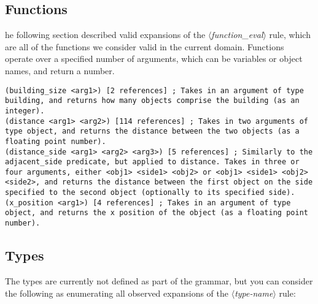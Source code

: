 \documentclass{article}
\newcommand{\dsl}[1]{{\it $\langle$#1$\rangle$}}
\begin{document}
\subsection{Functions} \label{sec:functions}
he following section described valid expansions of the \dsl{function_eval} rule,
        which are all of the functions we consider valid in the current domain.
        Functions operate over a specified number of arguments, which can be variables or object names, and return a number.
\begin{lstlisting}
(building_size <arg1>) [2 references] ; Takes in an argument of type building, and returns how many objects comprise the building (as an integer).
(distance <arg1> <arg2>) [114 references] ; Takes in two arguments of type object, and returns the distance between the two objects (as a floating point number).
(distance_side <arg1> <arg2> <arg3>) [5 references] ; Similarly to the adjacent_side predicate, but applied to distance. Takes in three or four arguments, either <obj1> <side1> <obj2> or <obj1> <side1> <obj2> <side2>, and returns the distance between the first object on the side specified to the second object (optionally to its specified side).
(x_position <arg1>) [4 references] ; Takes in an argument of type object, and returns the x position of the object (as a floating point number).
\end{lstlisting}



\subsection{Types} \label{sec:types}
The types are currently not defined as part of the grammar, but you can consider the following as enumerating all observed expansions of the \dsl{type-name} rule:
        
\end{document}

